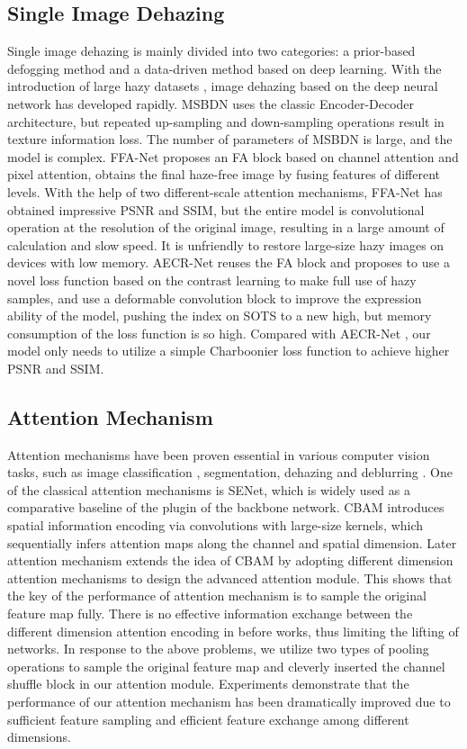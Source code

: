 \documentclass[final]{cvpr}
\begin{document}
\subsection{Single Image Dehazing}
Single image dehazing is mainly divided into two categories: a prior-based defogging method \cite{he2010single,colorattenuationprior} and a data-driven method based on deep learning. With the introduction of large hazy datasets \cite{SOTS,liu2021synthetic}, image dehazing based on the deep neural network has developed rapidly. MSBDN \cite{msbdn} uses the classic Encoder-Decoder architecture, but repeated up-sampling and down-sampling operations result in texture information loss. The number of parameters of MSBDN \cite{msbdn} is large, and the model is complex. FFA-Net \cite{ffa-net} proposes an FA block based on channel attention and pixel attention, obtains the final haze-free image by fusing features of different levels. With the help of two different-scale attention mechanisms, FFA-Net has obtained impressive PSNR and SSIM, but the entire model is convolutional operation at the resolution of the original image, resulting in a large amount of calculation and slow speed. It is unfriendly to restore large-size hazy images on devices with low memory. AECR-Net \cite{wu2021contrastive} reuses the FA block and proposes to use a novel loss function based on the contrast learning to make full use of hazy samples, and use a deformable convolution block to improve the expression ability of the model, pushing the index on SOTS \cite{SOTS} to a new high, but memory consumption of the loss function is so high. Compared with AECR-Net \cite{wu2021contrastive}, our model only needs to utilize a simple Charboonier\cite{charbonnier1994two} loss function to achieve higher PSNR and SSIM.
\subsection{Attention Mechanism}
Attention mechanisms have been proven essential in various computer vision tasks, such as image classification \cite{hu2018squeeze}, segmentation\cite{fu2019dual}, dehazing \cite{ffa-net,wu2021contrastive,kddn} and deblurring \cite{zamir2021multi}. One of the classical attention mechanisms is SENet\cite{hu2018squeeze}, which is widely used as a comparative baseline of the plugin of the backbone network. CBAM \cite{woo2018cbam} introduces spatial information encoding via convolutions with large-size kernels, which sequentially infers attention maps along the channel and spatial dimension. Later attention mechanism extends the idea of CBAM \cite{woo2018cbam} by adopting different dimension attention mechanisms to design the advanced attention module. This shows that the key of the performance of attention mechanism is to sample the original feature map fully. There is no effective information exchange between the different dimension attention encoding in before works, thus limiting the lifting of networks. In response to the above problems, we utilize two types of pooling operations to sample the original feature map and cleverly inserted the channel shuffle block in our attention module. Experiments
demonstrate that the performance of our attention mechanism has been dramatically improved due to sufficient feature sampling and efficient feature exchange among different dimensions.
\end{document}
